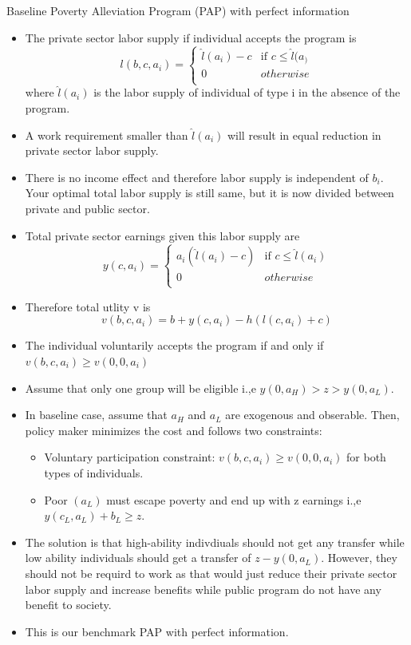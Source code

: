 \documentclass{beamer}
\begin{document}
\begin{frame}[allowframebreaks]{Baseline Poverty Alleviation Program (PAP) with perfect information}
\begin{itemize}
    \item The private sector labor supply if individual accepts the program is 
\[
l(b,c,a_i) = 
\begin{cases}
    \hat{l}(a_i)-c & \text{if } c \leq \hat{l}(a_) \\
    0 & otherwise \\
\end{cases}
\]
where $\hat{l}(a_i)$ is the labor supply of individual of type i in the absence of the program.
\item A work requirement smaller than $\hat{l}(a_i)$ will result in equal reduction in private sector labor supply. 
\item There is no income effect and therefore labor supply is independent of $b_i$. Your optimal total labor supply is still same, but it is now divided between private and public sector.
\item Total private sector earnings given this labor supply are 
\[y(c,a_i)= \begin{cases}
    a_i ( \hat{l}(a_i) - c) & \text{if } c \leq \hat{l}(a_i) \\     
    0 & otherwise \\
\end{cases} \]
\item Therefore total utlity v is 
\[v(b,c,a_i) = b+y(c,a_i) - h(l(c,a_i)+c)\]
\item The individual voluntarily accepts the program if and only if $v(b,c,a_i) \geq v(0,0,a_i)$
\item Assume that only one group will be eligible i.,e $y(0,a_H)>z>y(0,a_L)$.
\item In baseline case, assume that $a_H$ and $a_L$ are exogenous and obserable. Then, policy maker minimizes the cost and follows two constraints: 
\begin{itemize}
    \item Voluntary participation constraint: $v(b,c,a_i) \geq v(0,0,a_i)$ for both types of individuals.
    \item Poor $(a_L)$ must escape poverty and end up with z earnings i.,e $y(c_L,a_L)+b_L \geq z$.
     \end{itemize}

    \item The solution is that high-ability indivdiuals should not get any transfer while low ability individuals should get a transfer of $z-y(0,a_L)$. However, they should not be requird to work as that would just reduce their private sector labor supply and increase benefits while public program do not have any benefit to society. 
    \item This is our benchmark PAP with perfect information.


\end{itemize}

\end{frame}
\end{document}
